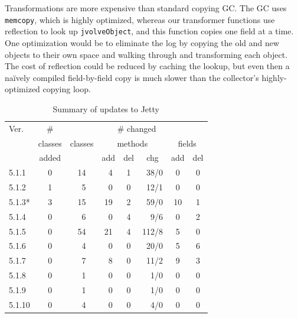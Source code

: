 \documentclass[9pt]{sigplanconf}
\newcommand\T{\rule{0pt}{2.0ex}}
\begin{document}
Transformations are more expensive than standard copying GC. The GC uses
\texttt{memcopy}, which is highly optimized, whereas our transformer
functions use reflection to look up \texttt{jvolveObject}, and this
function copies one field at a time.  One optimization would be to eliminate the log by copying
the old and new objects to their own space and %
walking through and transforming each object.
The cost of reflection could be
reduced by caching the lookup, but even then a na\"ively compiled
field-by-field copy is much slower than the collector's
highly-optimized copying loop.  %



\newcommand{\ChangedClassesColumn}{third}
\begin{table}
\begin{footnotesize}
\begin{center}
\begin{tabular}{|l||c||c|c|c|r|c|c|} \hline \T
Ver.    & \#      & \multicolumn{6}{c|}{\# changed} \\
        & classes & \multicolumn{1}{c|}{classes} & \multicolumn{3}{c|}{methods} & \multicolumn{2}{c|}{fields} \\
        & added   &         & add & del & \multicolumn{1}{c|}{chg}             & add & del \\ \hline \hline \T
5.1.1   & 0       & 14      &\ 4  & 1   &  38/0            &  0  & 0   \\
5.1.2   & 1       &\ 5      &\ 0  & 0   &  12/1            &  0  & 0   \\
5.1.3*  & 3       & 15      & 19  & 2   &  59/0            & 10  & 1   \\
5.1.4   & 0       &\ 6      &\ 0  & 4   &   9/6            &  0  & 2   \\
5.1.5   & 0       & 54      & 21  & 4   & 112/8            &  5  & 0   \\
5.1.6   & 0       &\ 4      &\ 0  & 0   &  20/0            &  5  & 6   \\
5.1.7   & 0       &\ 7      &\ 8  & 0   &  11/2            &  9  & 3   \\
5.1.8   & 0       &\ 1      &\ 0  & 0   &   1/0            &  0  & 0   \\
5.1.9   & 0       &\ 1      &\ 0  & 0   &   1/0            &  0  & 0   \\
5.1.10  & 0       &\ 4      &\ 0  & 0   &   4/0            &  0  & 0   \\ \hline
\end{tabular}
\end{center}
\end{footnotesize}
\caption{Summary of updates to Jetty}
\label{tab:jetty-changes}
\end{table}
\end{document}
